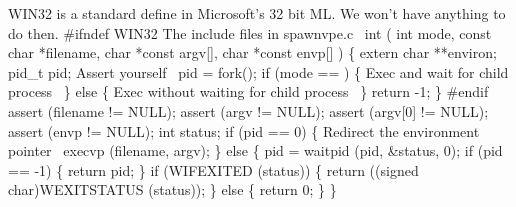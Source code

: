 \documentclass[11pt,a4paper]{article}%
\begin{document}
{\Tt{}WIN32} is a standard define in Microsoft's 32 bit ML. We won't
have anything to do then.
\nwenddocs{}\endmoddef\nwstartdeflinemarkup\nwenddeflinemarkup
#ifndef WIN32
\LA{}The include files in \code{}spawnvpe.c\edoc{}~{\nwtagstyle{}}\RA{}
int 
 (
  int mode, 
  const char *filename, 
  char *const argv[], 
  char *const envp[] )
\{
  extern char **environ;
  pid_t pid;
  \LA{}Assert yourself~{\nwtagstyle{}}\RA{}
  pid = fork();
  if (mode == )
  \{
    \LA{}Exec and wait for child process~{\nwtagstyle{}}\RA{}
  \}
  else
  \{
    \LA{}Exec without waiting for child process~{\nwtagstyle{}}\RA{}
  \}
  return -1;
\}
#endif
\nwendcode{}\endmoddef\nwstartdeflinemarkup{}\nwenddeflinemarkup
assert (filename != NULL);
assert (argv != NULL);
assert (argv[0] != NULL);
assert (envp != NULL);
\nwendcode{}\endmoddef\nwstartdeflinemarkup{}\nwenddeflinemarkup
int status;
if (pid == 0)
\{
  \LA{}Redirect the environment pointer~{\nwtagstyle{}}\RA{}
  execvp (filename, argv);
\}
else
\{
  pid = waitpid (pid, &status, 0);
  if (pid == -1)
  \{
    return pid;
  \}
  if (WIFEXITED (status))
  \{
    return ((signed char)WEXITSTATUS (status));
  \}
  else
  \{
    return 0;
  \}
\}
\nwendcode{}\endmoddef\nwstartdeflinemarkup{}\nwenddeflinemarkup
\end{document}
